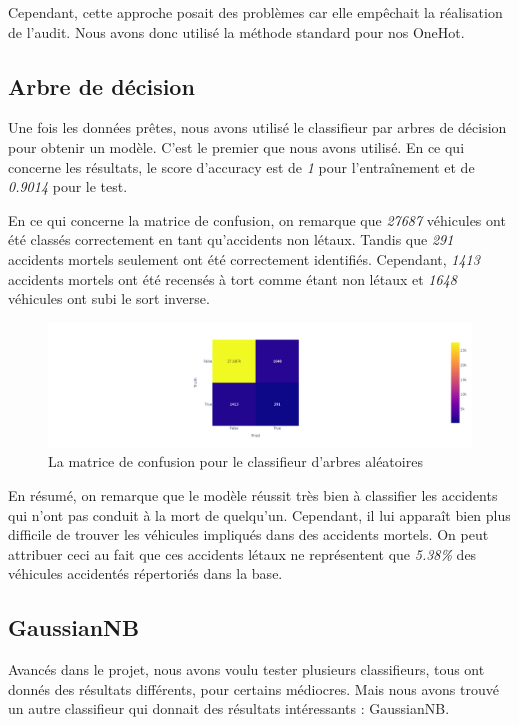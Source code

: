 \documentclass{article}
\begin{document}
    Cependant, cette approche posait des problèmes car elle empêchait la réalisation de l'audit. Nous avons donc utilisé la méthode 
    standard pour nos OneHot. 
    
    \subsection{Arbre de décision}
    Une fois les données prêtes, nous avons utilisé le classifieur par arbres de décision pour obtenir un modèle. C'est le premier que nous 
    avons utilisé. En ce qui concerne les résultats, le score d'accuracy est de \textit{1} pour l'entraînement et de \textit{0.9014} pour le test.
        
    En ce qui concerne la matrice de confusion, on remarque que \textit{27687} véhicules ont été classés correctement en tant qu'accidents non létaux.
    Tandis que \textit{291} accidents mortels seulement ont été correctement identifiés. Cependant, \textit{1413} accidents mortels ont été recensés à tort 
    comme étant non létaux et \textit{1648} véhicules ont subi le sort inverse. 
    
    \begin{figure}[h]
        \centering
        \includegraphics[width=\textwidth]{./img/matrice_confusion_tree.png}
        \caption{La matrice de confusion pour le classifieur d'arbres aléatoires}
    \end{figure}
    

    En résumé, on remarque que le modèle réussit très bien à classifier les accidents qui n'ont pas conduit à la mort de quelqu'un. Cependant, 
    il lui apparaît bien plus difficile de trouver les véhicules impliqués dans des accidents mortels. On peut attribuer ceci au fait que ces 
    accidents létaux ne représentent que \textit{5.38\%} des véhicules accidentés répertoriés dans la base.

    \subsection{GaussianNB}
    Avancés dans le projet, nous avons voulu tester plusieurs classifieurs, tous ont donnés des résultats différents, pour certains médiocres. 
    Mais nous avons trouvé un autre classifieur qui donnait des résultats intéressants : GaussianNB.
        
\end{document}
